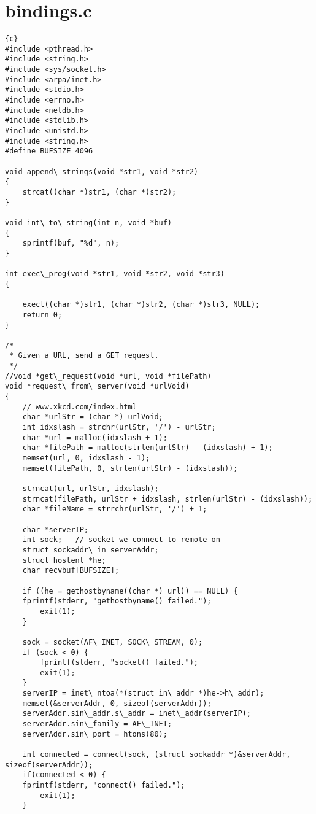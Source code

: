\section{bindings.c}
\begin{lstlisting}{c}
#include <pthread.h>
#include <string.h>
#include <sys/socket.h>
#include <arpa/inet.h>
#include <stdio.h>
#include <errno.h>
#include <netdb.h>
#include <stdlib.h>
#include <unistd.h>
#include <string.h>
#define BUFSIZE 4096

void append\_strings(void *str1, void *str2)
{
    strcat((char *)str1, (char *)str2);
}

void int\_to\_string(int n, void *buf)
{
    sprintf(buf, "%d", n);
}

int exec\_prog(void *str1, void *str2, void *str3)
{

    execl((char *)str1, (char *)str2, (char *)str3, NULL);
    return 0;
}

/*
 * Given a URL, send a GET request.
 */
//void *get\_request(void *url, void *filePath)
void *request\_from\_server(void *urlVoid)
{
    // www.xkcd.com/index.html
    char *urlStr = (char *) urlVoid;
    int idxslash = strchr(urlStr, '/') - urlStr;
    char *url = malloc(idxslash + 1);
    char *filePath = malloc(strlen(urlStr) - (idxslash) + 1);
    memset(url, 0, idxslash - 1);
    memset(filePath, 0, strlen(urlStr) - (idxslash));

    strncat(url, urlStr, idxslash);
    strncat(filePath, urlStr + idxslash, strlen(urlStr) - (idxslash));
    char *fileName = strrchr(urlStr, '/') + 1;

    char *serverIP;
    int sock;   // socket we connect to remote on
    struct sockaddr\_in serverAddr;
    struct hostent *he;
    char recvbuf[BUFSIZE];

    if ((he = gethostbyname((char *) url)) == NULL) {
	fprintf(stderr, "gethostbyname() failed.");
        exit(1);
    }

    sock = socket(AF\_INET, SOCK\_STREAM, 0);
    if (sock < 0) {
        fprintf(stderr, "socket() failed.");
        exit(1);
    }
    serverIP = inet\_ntoa(*(struct in\_addr *)he->h\_addr);
    memset(&serverAddr, 0, sizeof(serverAddr));
    serverAddr.sin\_addr.s\_addr = inet\_addr(serverIP);
    serverAddr.sin\_family = AF\_INET;
    serverAddr.sin\_port = htons(80);

    int connected = connect(sock, (struct sockaddr *)&serverAddr, sizeof(serverAddr));
    if(connected < 0) {
	fprintf(stderr, "connect() failed.");
        exit(1);
    }


\end{lstlisting}
